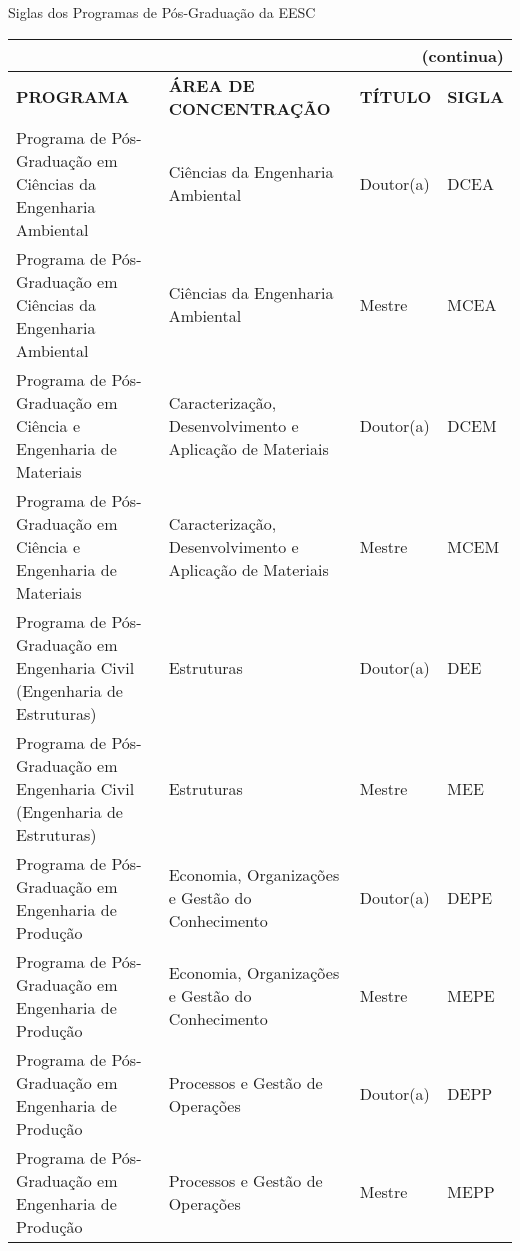 \begin{apendicesenv}
\begin{quadro}[Htb]
\ABNTEXfontereduzida
\caption[Siglas dos Programas de P\'os-Gradua\c{c}\~ao da EESC]{Siglas dos Programas de P\'os-Gradua\c{c}\~ao da EESC} 
\label{quadro-eesc}
\begin{tabular}{|p{6.0cm}|p{4.5cm}|p{2.0cm}|p{1.75cm}|}
\multicolumn{4}{r}{{(continua)}} \\ 
  \hline
   \textbf{PROGRAMA} & \textbf{\'AREA DE CONCENTRA\c{C}\~AO} & \textbf{T\'ITULO} & \textbf{SIGLA}  \\
    \hline
Programa de P\'os-Gradua\c{c}\~ao em Ci\^encias da Engenharia Ambiental & Ci\^encias da Engenharia Ambiental & Doutor(a) & DCEA \\
Programa de P\'os-Gradua\c{c}\~ao em Ci\^encias da Engenharia Ambiental & Ci\^encias da Engenharia Ambiental & Mestre & MCEA \\
Programa de P\'os-Gradua\c{c}\~ao em Ci\^encia e Engenharia de Materiais & Caracteriza\c{c}\~ao, Desenvolvimento e Aplica\c{c}\~ao de Materiais  & Doutor(a) & DCEM \\
Programa de P\'os-Gradua\c{c}\~ao em Ci\^encia e Engenharia de Materiais & Caracteriza\c{c}\~ao, Desenvolvimento e Aplica\c{c}\~ao de Materiais & Mestre & MCEM \\
Programa de P\'os-Gradua\c{c}\~ao em Engenharia Civil (Engenharia de Estruturas) & Estruturas & Doutor(a) & DEE \\
Programa de P\'os-Gradua\c{c}\~ao em Engenharia Civil (Engenharia de Estruturas) & Estruturas & Mestre & MEE \\
Programa de P\'os-Gradua\c{c}\~ao em Engenharia de Produ\c{c}\~ao & Economia, Organiza\c{c}\~oes e Gest\~ao do Conhecimento & Doutor(a) & DEPE \\
Programa de P\'os-Gradua\c{c}\~ao em Engenharia de Produ\c{c}\~ao & Economia, Organiza\c{c}\~oes e Gest\~ao do Conhecimento & Mestre & MEPE \\
Programa de P\'os-Gradua\c{c}\~ao em Engenharia de Produ\c{c}\~ao & Processos e Gest\~ao de Opera\c{c}\~oes & Doutor(a) & DEPP \\
Programa de P\'os-Gradua\c{c}\~ao em Engenharia de Produ\c{c}\~ao & Processos e Gest\~ao de Opera\c{c}\~oes & Mestre & MEPP \\

\end{tabular}
\end{quadro}
\end{apendicesenv}
